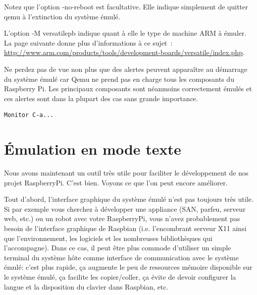 \documentclass{article}
\begin{document}
Notez que l'option \og{}-no-reboot\fg{} est facultative. Elle indique
simplement de quitter qemu à l'extinction du système émulé.


L'option \og{}-M versatilepb\fg{} indique quant à elle le type de machine ARM à
émuler. La page suivante donne plus d'informations à ce sujet~:
\href{https://web.archive.org/web/20150327192315/http://arm.com/products/tools/development-boards/versatile/index.php}{http://www.arm.com/products/tools/development-boards/versatile/index.php}.

Ne perdez pas de vue non plus que des alertes peuvent apparaître au démarrage
du système émulé car Qemu ne prend pas en charge tous les composants du
Raspberry Pi. Les principaux composants sont néanmoins correctement émulés et
ces alertes sont dans la plupart des cas sans grande importance.

\begin{verbatim}
Monitor C-a...
\end{verbatim}



\section{Émulation en mode texte}\label{sec:console-only}

Nous avons maintenant un outil très utile pour faciliter le développement de nos
projet RaspberryPi.
C'est bien.
Voyons ce que l'on peut encore améliorer.

Tout d'abord, l'interface graphique du système émulé n'est pas toujours très
utile.
Si par exemple vous cherchez à développer une appliance (SAN, parfeu, serveur
web, etc.) ou un robot avec votre RaspberryPi, vous n'avez probablement pas
besoin de l'interface graphique de Raspbian (i.e. l'encombrant serveur X11
ainsi que l'environnement, les logiciels et les nombreuses bibliothèques qui
l'accompagne).
Dans ce cas, il peut être plus commode d'utiliser un simple terminal du système
hôte comme interface de communication avec le système émulé: c'est plus rapide,
ça augmente le peu de ressources mémoire disponible sur le système émulé, ça
facilite les copier/coller, ça évite de devoir configurer la langue et la
disposition du clavier dans Raspbian, etc.
\end{document}
